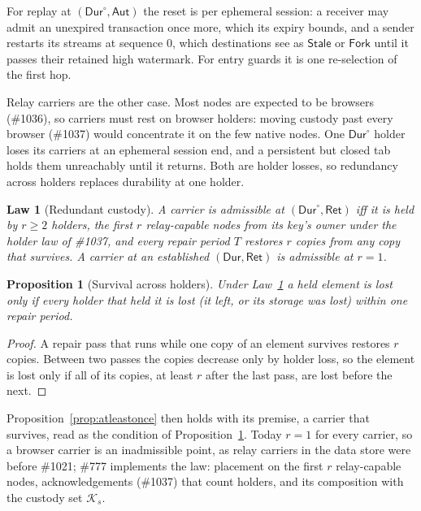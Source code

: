 \documentclass[journal]{IEEEtran}
\newtheorem{law}{Law}
\newtheorem{proposition}{Proposition}
\newcommand{\Durable}{\mathsf{Dur}}
\newcommand{\Retained}{\mathsf{Ret}}
\newcommand{\Auth}{\mathsf{Aut}}
\newcommand{\K}{\mathcal{K}}
\newcommand{\issue}[1]{\#{#1}}
\begin{document}
For replay at $(\Durable^{\circ},\Auth)$ the reset is per ephemeral session: a receiver may
admit an unexpired transaction once more, which its expiry bounds, and a sender restarts its
streams at sequence $0$, which destinations see as $\mathsf{Stale}$ or $\mathsf{Fork}$ until
it passes their retained high watermark.  For entry guards it is one re-selection of the
first hop.

Relay carriers are the other case.  Most nodes are expected to be browsers
(\issue{1036}), so carriers must rest on browser holders: moving custody past every
browser (\issue{1037}) would concentrate it on the few native nodes.  One
$\Durable^{\circ}$ holder loses its carriers at an ephemeral session end, and a persistent
but closed tab holds them unreachably until it returns.  Both are holder losses, so
redundancy across holders replaces durability at one holder.

\begin{law}[Redundant custody]\label{law:redundant}
A carrier is admissible at $(\Durable^{\circ},\Retained)$ iff it is held by $r\ge2$ holders,
the first $r$ relay-capable nodes from its key's owner under the holder law of
\issue{1037}, and every repair period $T$ restores $r$ copies from any copy that survives.
A carrier at an established $(\Durable,\Retained)$ is admissible at $r=1$.
\end{law}

\begin{proposition}[Survival across holders]\label{prop:redundant}
Under Law~\ref{law:redundant} a held element is lost only if every holder that held it is
lost (it left, or its storage was lost) within one repair period.
\end{proposition}
\begin{proof}
A repair pass that runs while one copy of an element survives restores $r$ copies.  Between
two passes the copies decrease only by holder loss, so the element is lost only if all of
its copies, at least $r$ after the last pass, are lost before the next.
\end{proof}

Proposition~\ref{prop:atleastonce} then holds with its premise, a carrier that survives, read
as the condition of Proposition~\ref{prop:redundant}.  Today $r=1$ for every carrier, so a
browser carrier is an inadmissible point, as relay carriers in the data store were before
\issue{1021}; \issue{777} implements the law: placement on the first $r$ relay-capable
nodes, acknowledgements (\issue{1037}) that count holders, and its composition with the
custody set $\K_s$.
\end{document}
